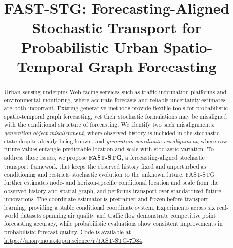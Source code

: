 \documentclass[sigconf, anonymous, review]{acmart}
\begin{document}
\title{FAST-STG: Forecasting-Aligned Stochastic Transport for Probabilistic Urban Spatio-Temporal Graph Forecasting}

\begin{abstract}
Urban sensing underpins Web-facing services such as traffic information
platforms and environmental monitoring, where accurate forecasts and
reliable uncertainty estimates are both important. Existing generative
methods provide flexible tools for probabilistic spatio-temporal graph
forecasting, yet their stochastic formulations may be misaligned with
the conditional structure of forecasting. We identify two such
misalignments: \emph{generation-object misalignment}, where observed history is included in the stochastic state despite already being known, and \emph{generation-coordinate misalignment}, where raw future
values entangle predictable location and scale with stochastic
variation. To address these issues, we propose \textbf{FAST-STG}, a forecasting-aligned stochastic transport framework that keeps the observed history fixed and unperturbed as conditioning and restricts stochastic evolution to the unknown future. FAST-STG further estimates node- and horizon-specific conditional location and scale from the
observed history and spatial graph, and performs transport over
standardized future innovations. The coordinate estimator is pretrained
and frozen before transport learning, providing a stable conditional
coordinate system. Experiments across six real-world datasets spanning air quality and traffic flow demonstrate competitive point forecasting accuracy, while probabilistic evaluations show consistent improvements in probabilistic forecast quality. Code is available at
\url{https://anonymous.4open.science/r/FAST-STG-7D84}.
\end{abstract}

\maketitle
\end{document}
